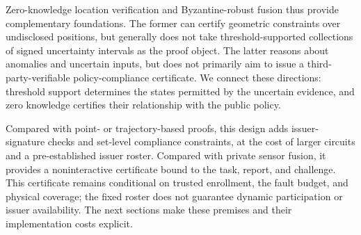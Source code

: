 Zero-knowledge location verification and Byzantine-robust fusion thus provide complementary foundations. The former can certify geometric constraints over undisclosed positions, but generally does not take threshold-supported collections of signed uncertainty intervals as the proof object. The latter reasons about anomalies and uncertain inputs, but does not primarily aim to issue a third-party-verifiable policy-compliance certificate. We connect these directions: threshold support determines the states permitted by the uncertain evidence, and zero knowledge certifies their relationship with the public policy.

Compared with point- or trajectory-based proofs, this design adds issuer-signature checks and set-level compliance constraints, at the cost of larger circuits and a pre-established issuer roster. Compared with private sensor fusion, it provides a noninteractive certificate bound to the task, report, and challenge. This certificate remains conditional on trusted enrollment, the fault budget, and physical coverage; the fixed roster does not guarantee dynamic participation or issuer availability. The next sections make these premises and their implementation costs explicit.
